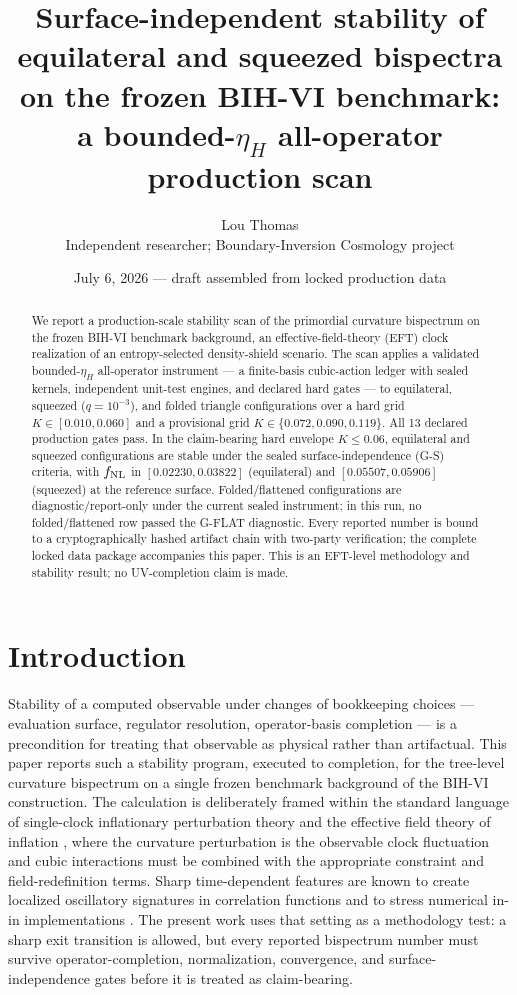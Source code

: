 \documentclass[11pt]{article}
\title{Surface-independent stability of equilateral and squeezed bispectra\\
on the frozen BIH-VI benchmark: a bounded-$\eta_H$ all-operator production scan}
\author{Lou Thomas\\ \small Independent researcher; Boundary-Inversion Cosmology project}
\date{July 6, 2026 --- draft assembled from locked production data}
\begin{document}
\maketitle

\begin{abstract}
We report a production-scale stability scan of the primordial curvature bispectrum on the frozen
BIH-VI benchmark background, an effective-field-theory (EFT) clock realization of an
entropy-selected density-shield scenario. The scan applies a validated bounded-$\eta_H$
all-operator instrument --- a finite-basis cubic-action ledger with sealed kernels, independent
unit-test engines, and declared hard gates --- to equilateral, squeezed
($q = 10^{-3}$), and folded triangle configurations over a hard grid $K \in [0.010, 0.060]$ and a
provisional grid $K \in \{0.072, 0.090, 0.119\}$. All 13 declared production gates pass. In the
claim-bearing hard envelope $K \leq 0.06$, equilateral and squeezed configurations are stable under
the sealed surface-independence (G-S) criteria, with $f_{\rm NL}$ in
$[0.02230, 0.03822]$ (equilateral) and $[0.05507, 0.05906]$ (squeezed) at the reference surface.
Folded/flattened configurations are diagnostic/report-only under the current sealed instrument; in
this run, no folded/flattened row passed the G-FLAT diagnostic. Every reported number is bound to a
cryptographically hashed artifact chain with two-party verification; the complete locked data
package accompanies this paper. This is an EFT-level methodology and stability result; no
UV-completion claim is made.
\end{abstract}

\section{Introduction}
Stability of a computed observable under changes of bookkeeping choices --- evaluation surface,
regulator resolution, operator-basis completion --- is a precondition for treating that observable
as physical rather than artifactual. This paper reports such a stability program, executed to
completion, for the tree-level curvature bispectrum on a single frozen benchmark background of the
BIH-VI construction. The calculation is deliberately framed within the standard language of
single-clock inflationary perturbation theory and the effective field theory of inflation
\cite{maldacena2003,cheung2008}, where the curvature perturbation is the observable clock fluctuation
and cubic interactions must be combined with the appropriate constraint and field-redefinition terms.
Sharp time-dependent features are known to create localized oscillatory signatures in correlation
functions and to stress numerical in-in implementations \cite{chen2007,adshead2012}. The present work
uses that setting as a methodology test: a sharp exit transition is allowed, but every reported
bispectrum number must survive operator-completion, normalization, convergence, and surface-independence
gates before it is treated as claim-bearing.
\end{document}
